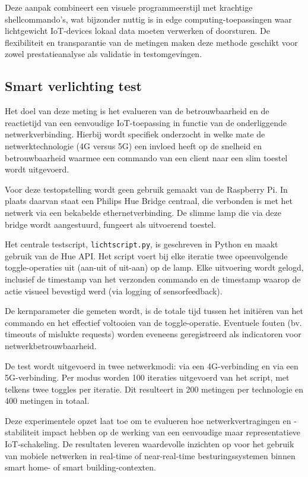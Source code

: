 Deze aanpak combineert een visuele programmeerstijl met krachtige shellcommando’s, wat bijzonder nuttig is in edge computing-toepassingen waar lichtgewicht IoT-devices lokaal data moeten verwerken of doorsturen. De flexibiliteit en transparantie van de metingen maken deze methode geschikt voor zowel prestatieanalyse als validatie in testomgevingen.


\subsection{Smart verlichting test}
Het doel van deze meting is het evalueren van de betrouwbaarheid en de reactietijd van een eenvoudige IoT-toepassing in functie van de onderliggende netwerkverbinding. Hierbij wordt specifiek onderzocht in welke mate de netwerktechnologie (4G versus 5G) een invloed heeft op de snelheid en betrouwbaarheid waarmee een commando van een client naar een slim toestel wordt uitgevoerd.

Voor deze testopstelling wordt geen gebruik gemaakt van de Raspberry Pi. In plaats daarvan staat een Philips Hue Bridge centraal, die verbonden is met het netwerk via een bekabelde ethernetverbinding. De slimme lamp die via deze bridge wordt aangestuurd, fungeert als uitvoerend toestel. 

Het centrale testscript, \texttt{lichtscript.py}, is geschreven in Python en maakt gebruik van de Hue API. Het script voert bij elke iteratie twee opeenvolgende toggle-operaties uit (aan-uit of uit-aan) op de lamp. Elke uitvoering wordt gelogd, inclusief de timestamp van het verzonden commando en de timestamp waarop de actie visueel bevestigd werd (via logging of sensorfeedback).


De kernparameter die gemeten wordt, is de totale tijd tussen het initiëren van het commando en het effectief voltooien van de toggle-operatie. Eventuele fouten (bv. timeouts of mislukte requests) worden eveneens geregistreerd als indicatoren voor netwerkbetrouwbaarheid.

De test wordt uitgevoerd in twee netwerkmodi: via een 4G-verbinding en via een 5G-verbinding. Per modus worden 100 iteraties uitgevoerd van het script, met telkens twee toggles per iteratie. Dit resulteert in 200 metingen per technologie en 400 metingen in totaal.

Deze experimentele opzet laat toe om te evalueren hoe netwerkvertragingen en -stabiliteit impact hebben op de werking van een eenvoudige maar representatieve IoT-schakeling. De resultaten leveren waardevolle inzichten op voor het gebruik van mobiele netwerken in real-time of near-real-time besturingssystemen binnen smart home- of smart building-contexten.


